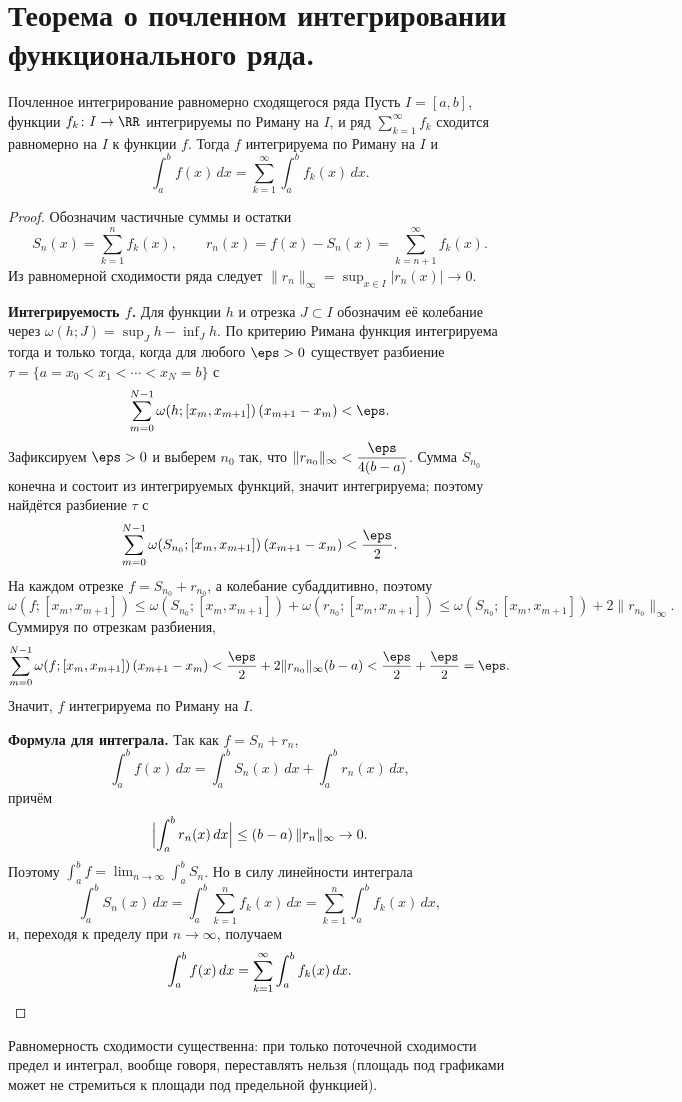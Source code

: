 
\section{Теорема о почленном интегрировании функционального ряда.}

\begin{Theorem}{Почленное интегрирование равномерно сходящегося ряда}{}
	Пусть $I = [a, b]$, функции $f_k \colon I \to \RR$ интегрируемы по Риману на $I$, и ряд $\sum_{k=1}^{\infty} f_k$ сходится равномерно на $I$ к функции $f$. Тогда $f$ интегрируема по Риману на $I$ и
	\[
	\int_a^b f(x)\,dx = \sum_{k=1}^{\infty} \int_a^b f_k(x)\,dx.
	\]
\end{Theorem}

\begin{proof}
	Обозначим частичные суммы и остатки
	\[
	S_n(x) = \sum_{k=1}^{n} f_k(x), \qquad r_n(x) = f(x) - S_n(x) = \sum_{k=n+1}^{\infty} f_k(x).
	\]
	Из равномерной сходимости ряда следует $\|r_n\|_\infty = \sup_{x \in I} |r_n(x)| \to 0$.

	\textbf{Интегрируемость $f$.} Для функции $h$ и отрезка $J \subset I$ обозначим её колебание через $\omega(h; J) = \sup_J h - \inf_J h$. По критерию Римана функция интегрируема тогда и только тогда, когда для любого $\eps > 0$ существует разбиение $\tau = \{a = x_0 < x_1 < \cdots < x_N = b\}$ с
	\[
	\sum_{m=0}^{N-1} \omega(h; [x_m, x_{m+1}])\,(x_{m+1} - x_m) < \eps.
	\]
	Зафиксируем $\eps > 0$ и выберем $n_0$ так, что $\|r_{n_0}\|_\infty < \dfrac{\eps}{4(b - a)}$. Сумма $S_{n_0}$ конечна и состоит из интегрируемых функций, значит интегрируема; поэтому найдётся разбиение $\tau$ с
	\[
	\sum_{m=0}^{N-1} \omega(S_{n_0}; [x_m, x_{m+1}])\,(x_{m+1} - x_m) < \frac{\eps}{2}.
	\]
	На каждом отрезке $f = S_{n_0} + r_{n_0}$, а колебание субаддитивно, поэтому
	\[
	\omega(f; [x_m, x_{m+1}]) \le \omega(S_{n_0}; [x_m, x_{m+1}]) + \omega(r_{n_0}; [x_m, x_{m+1}]) \le \omega(S_{n_0}; [x_m, x_{m+1}]) + 2\|r_{n_0}\|_\infty.
	\]
	Суммируя по отрезкам разбиения,
	\[
	\sum_{m=0}^{N-1} \omega(f; [x_m, x_{m+1}])\,(x_{m+1} - x_m) < \frac{\eps}{2} + 2\|r_{n_0}\|_\infty (b - a) < \frac{\eps}{2} + \frac{\eps}{2} = \eps.
	\]
	Значит, $f$ интегрируема по Риману на $I$.

	\textbf{Формула для интеграла.} Так как $f = S_n + r_n$,
	\[
	\int_a^b f(x)\,dx = \int_a^b S_n(x)\,dx + \int_a^b r_n(x)\,dx,
	\]
	причём
	\[
	\Bigl| \int_a^b r_n(x)\,dx \Bigr| \le (b - a)\,\|r_n\|_\infty \to 0.
	\]
	Поэтому $\int_a^b f = \lim_{n \to \infty} \int_a^b S_n$. Но в силу линейности интеграла
	\[
	\int_a^b S_n(x)\,dx = \int_a^b \sum_{k=1}^{n} f_k(x)\,dx = \sum_{k=1}^{n} \int_a^b f_k(x)\,dx,
	\]
	и, переходя к пределу при $n \to \infty$, получаем
	\[
	\int_a^b f(x)\,dx = \sum_{k=1}^{\infty} \int_a^b f_k(x)\,dx. \qedhere
	\]
\end{proof}

\begin{Remark}{}{}
	Равномерность сходимости существенна: при только поточечной сходимости предел и интеграл, вообще говоря, переставлять нельзя (площадь под графиками может не стремиться к площади под предельной функцией).
\end{Remark}
